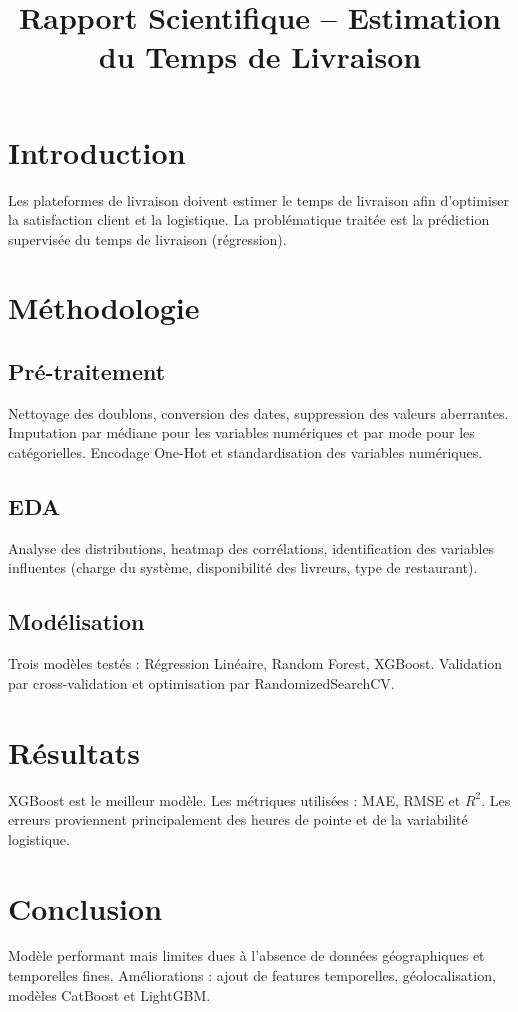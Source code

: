 \documentclass[12pt]{article}
\title{Rapport Scientifique -- Estimation du Temps de Livraison}
\author{}
\date{}
\begin{document}
\maketitle

\section{Introduction}
Les plateformes de livraison doivent estimer le temps de livraison afin d'optimiser la satisfaction client et la logistique. La problématique traitée est la prédiction supervisée du temps de livraison (régression).

\section{Méthodologie}
\subsection{Pré-traitement}
Nettoyage des doublons, conversion des dates, suppression des valeurs aberrantes. Imputation par médiane pour les variables numériques et par mode pour les catégorielles. Encodage One-Hot et standardisation des variables numériques.

\subsection{EDA}
Analyse des distributions, heatmap des corrélations, identification des variables influentes (charge du système, disponibilité des livreurs, type de restaurant).

\subsection{Modélisation}
Trois modèles testés : Régression Linéaire, Random Forest, XGBoost. Validation par cross-validation et optimisation par RandomizedSearchCV.

\section{Résultats}
XGBoost est le meilleur modèle. Les métriques utilisées : MAE, RMSE et $R^2$. Les erreurs proviennent principalement des heures de pointe et de la variabilité logistique.

\section{Conclusion}
Modèle performant mais limites dues à l'absence de données géographiques et temporelles fines. Améliorations : ajout de features temporelles, géolocalisation, modèles CatBoost et LightGBM.
\end{document}
